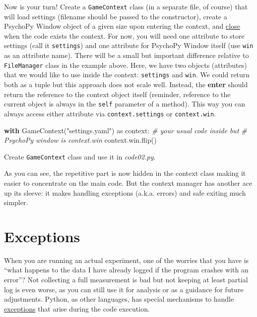 \documentclass[
]{book}
\newenvironment{Shaded}{\begin{snugshade}}{\end{snugshade}}
\newcommand{\CommentTok}[1]{\textcolor[rgb]{0.56,0.35,0.01}{\textit{#1}}}
\newcommand{\ControlFlowTok}[1]{\textcolor[rgb]{0.13,0.29,0.53}{\textbf{#1}}}
\newcommand{\ImportTok}[1]{#1}
\newcommand{\NormalTok}[1]{#1}
\newcommand{\StringTok}[1]{\textcolor[rgb]{0.31,0.60,0.02}{#1}}
\begin{document}
Now is your turn! Create a \texttt{GameContext} class (in a separate file, of course) that will load settings (filename should be passed to the constructor), create a PsychoPy Window object of a given size upon entering the context, and \href{https://psychopy.org/api/visual/window.html\#psychopy.visual.Window.close}{close} when the code exists the context. For now, you will need one attribute to store settings (call it \texttt{settings}) and one attribute for PsychoPy Window itself (use \texttt{win} as an attribute name). There will be a small but important difference relative to \texttt{FileManager} class in the example above. Here, we have two objects (attributes) that we would like to use inside the context: \texttt{settings} and \texttt{win}. We could return both as a tuple but this approach does not scale well. Instead, the \textbf{enter} should return the reference to the context object itself (reminder, reference to the current object is always in the \texttt{self} parameter of a method). This way you can always access either attribute via \texttt{context.settings} or \texttt{context.win}.

\begin{Shaded}
\begin{Highlighting}[]
\ControlFlowTok{with}\NormalTok{ GameContext(}\StringTok{"settings.yaml"}\NormalTok{) }\ImportTok{as}\NormalTok{ context:}
  \CommentTok{\# your usual code inside but}
  \CommentTok{\# PsychoPy window is context.win}
\NormalTok{  context.win.flip()}
\end{Highlighting}
\end{Shaded}

Create \texttt{GameContext} class and use it in \emph{code02.py}.

As you can see, the repetitive part is now hidden in the context class making it easier to concentrate on the main code. But the context manager has another ace up its sleeve: it makes handling exceptions (a.k.a. errors) and safe exiting much simpler.

\hypertarget{exceptions}{%
\section{Exceptions}\label{exceptions}}

When you are running an actual experiment, one of the worries that you have is ``what happens to the data I have already logged if the program crashes with an error''? Not collecting a full measurement is bad but not keeping at least partial log is even worse, as you can still use it for analysis or as a guidance for future adjustments. Python, as other languages, has special mechanisms to handle \href{https://docs.python.org/3/tutorial/errors.html}{exceptions} that arise during the code execution.
\end{document}
